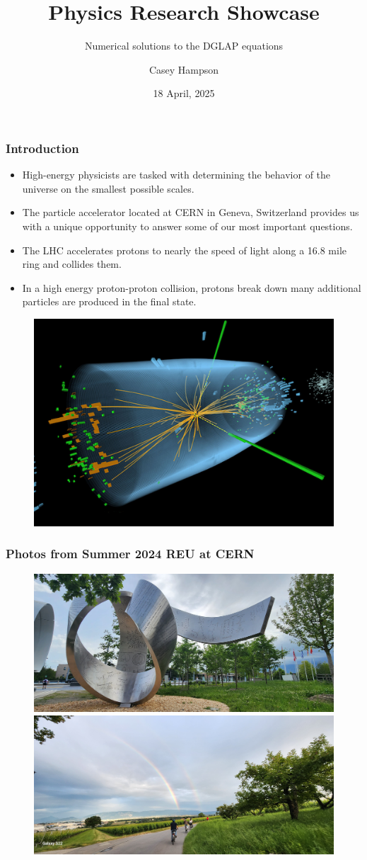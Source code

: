 \documentclass{beamer}
\title{Physics Research Showcase}
\subtitle{Numerical solutions to the DGLAP equations}
\author{Casey Hampson}
\date{18 April, 2025}
\begin{document}
\frame{\titlepage}




\begin{frame}
  \frametitle{Introduction}

  \begin{itemize}
  \item High-energy physicists are tasked with determining the behavior of the universe on the smallest possible scales.
  \item The particle accelerator located at CERN in Geneva, Switzerland provides us with a unique opportunity to answer some of our most important questions.
  \item The LHC accelerates protons to nearly the speed of light along a 16.8 mile ring and collides them.
  \item In a high energy proton-proton collision, protons break down many additional particles are produced in the final state.
  \end{itemize}

  \begin{figure}
    \centering
    \includegraphics[width=0.35\linewidth]{./gfx/lhc.jpg}
  \end{figure}
  
\end{frame}


\begin{frame}
  \frametitle{Photos from Summer 2024 REU at CERN}

  \begin{figure}
    \centering
    \includegraphics[width=0.6\linewidth]{./gfx/cern/1.jpg}
    \includegraphics[width=0.6\linewidth]{./gfx/cern/2.jpg}
  \end{figure}
  
\end{frame}
\end{document}
